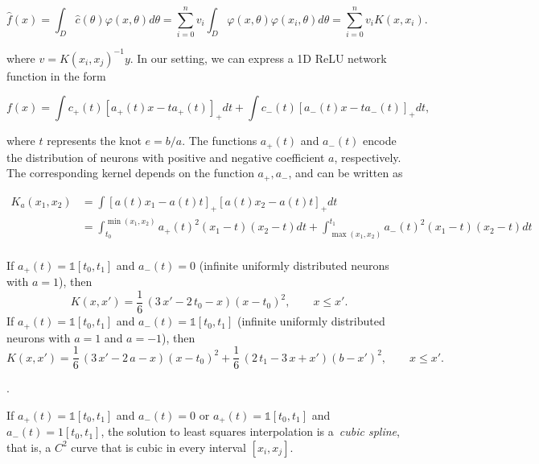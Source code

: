 \begin{equation}
    \hat f(x) = \int_D \hat c(\theta) \varphi(x,\theta) d\theta = \sum_{i=0}^n v_i \int_D \varphi(x,\theta)\varphi(x_i,\theta) d\theta = \sum_{i=0}^n v_i K(x,x_i).
\end{equation}

where $v = K(x_i,x_j)^{-1} y$. In our setting, we can express a 1D ReLU network function in the form

\begin{equation}
f(x) = \int c_+(t)[a_+(t) x - ta_+(t)]_+ dt + \int c_-(t)[a_-(t) x - ta_-(t)]_+ dt,
\end{equation}

where $t$ represents the knot $e = b/a$. The functions $a_+(t)$ and $a_{-}(t)$ encode the distribution of neurons
with positive and negative coefficient $a$, respectively. The corresponding kernel depends on the function $a_+,a_-$, and can be written as

\begin{equation}
\begin{aligned}
K_a(x_1,x_2) &= \int [a(t) x_1 - a(t)t]_+ [a(t) x_2 - a(t)t]_+ dt\\
&= \int_{t_0}^{\min(x_1,x_2)} a_+(t)^2 (x_1 - t) (x_2 - t)
dt + \int_{\max(x_1,x_2)}^{t_1} a_{-}(t)^2 (x_1 - t) (x_2 - t) dt\\
\end{aligned}
\end{equation}

\begin{proposition} If $a_+(t) = \mathds 1[t_0,t_1]$ and $a_-(t) = 0$ (infinite uniformly distributed neurons with $a=1$), then
\[
K(x, x') = \frac{1}{6} \, {\left(3 \, x' -2 \, t_0 - x\right)} {\left(x-t_0\right)}^{2}, \qquad x \le x'.
\]
If $a_+(t) = \mathds 1[t_0,t_1]$ and  $a_-(t) = \mathds 1[t_0,t_1]$ (infinite uniformly distributed neurons with $a=1$ and $a=-1$), then
\[
K(x, x') = \frac{1}{6} \, {\left(3 \, x' - 2 \, a - x \right)} {\left(x - t_0\right)}^{2} + \frac{1}{6} \, {\left(2 \, t_1 - 3 \, x + x'\right)} {\left(b - x'\right)}^{2}, \qquad x \le x'.
\]
\end{proposition}

.

\begin{corollary}
If $a_+(t) = \mathds 1[t_0,t_1]$ and $a_-(t) = 0$ or $a_+(t) = \mathds 1
[t_0,t_1]$ and $a_-(t) = 1[t_0,t_1]$, the solution to least squares interpolation is a~\emph{cubic spline}, that is, a $C^2$ curve that is cubic in every interval $[x_i,x_j]$.
\end{corollary}

